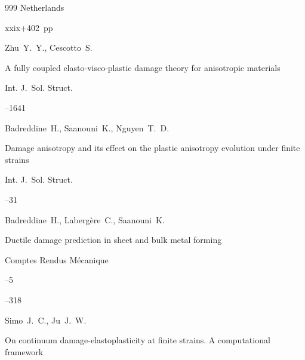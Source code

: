 \begin{thebibliography}{999}
\publaddr Netherlands

\totalpages xxix+402~pp \nofrills







\by Zhu~Y.~Y., Cescotto~S. 

\paper A fully coupled elasto-visco-plastic damage theory for anisotropic materials

\jour Int. J.~Sol. Struct.




--1641






\by Badreddine~H., Saanouni~K., Nguyen~T.~D.

\paper Damage anisotropy and its effect on the plastic anisotropy evolution under finite strains

\jour Int. J.~Sol. Struct.



--31






\by Badreddine~H., Laberg\`ere~C., Saanouni~K. 

\paper Ductile damage prediction in sheet and bulk metal forming

\jour Comptes Rendus M\'ecanique



--5

--318






\by  Simo~J.~C., Ju~J.~W. 

\paper On continuum damage-elastoplasticity at finite strains. A computational framework


\end{thebibliography}
